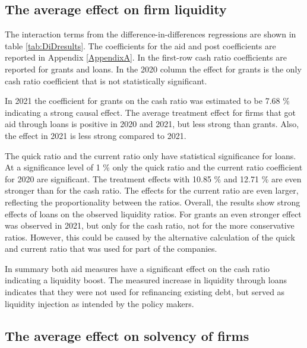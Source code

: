 \subsection{The average effect on firm liquidity}



The interaction terms from the difference-in-differences regressions are shown in table \ref{tab:DiDresults}. 
The coefficients for the aid and post coefficients are reported in Appendix \ref{AppendixA}. In the first-row cash ratio coefficients are reported for grants and loans. In the 2020 column the effect for grants is the only cash ratio coefficient that is not statistically significant. 

In 2021 the coefficient for grants on the cash ratio was estimated to be 7.68 \% indicating a strong causal effect. The average treatment effect for firms that got aid through loans is positive in 2020 and 2021, but less strong than grants. Also, the effect in 2021 is less strong compared to 2021.

The quick ratio and the current ratio only have statistical significance for loans. At a significance level of 1 \% only the quick ratio and the current ratio coefficient for 2020 are significant. The treatment effects with 10.85 \% and 12.71 \% are even stronger than for the cash ratio. The effects for the current ratio are even larger, reflecting the proportionality between the ratios. Overall, the results show strong effects of loans on the observed liquidity ratios. For grants an even stronger effect was observed in 2021, but only for the cash ratio, not for the more conservative ratios. However, this could be caused by the alternative calculation of the quick and current ratio that was used for part of the companies. 

In summary both aid measures have a significant effect on the cash ratio indicating a liquidity boost. The measured increase in liquidity through loans indicates that they were not used for refinancing existing debt, but served as liquidity injection as intended by the policy makers.

\subsection{The average effect on solvency of firms}


